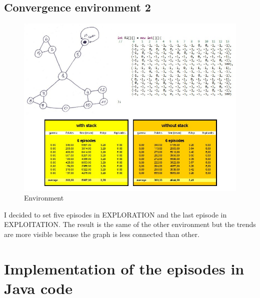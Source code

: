 \documentclass[a4paper]{article}
\begin{document}
\subsection{Convergence environment 2}
\begin{figure}[htbp]
\begin{center}
\includegraphics[scale=0.75]{env2.jpg}
\caption{Environment}
\end{center}
\end{figure}
I decided to set five episodes in EXPLORATION and the last episode in EXPLOITATION.
The result is the same of the other environment but the trends are more visible because the graph is less connected than other.

\newpage
\section{Implementation of the episodes in Java code}
\end{document}
